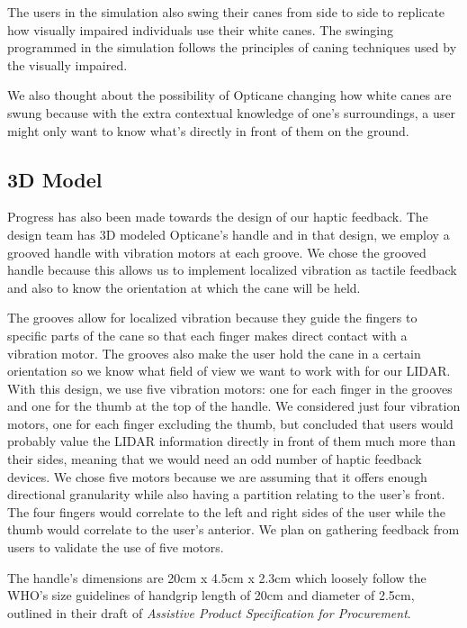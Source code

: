 \documentclass{article}
\begin{document}
The users in the simulation also swing their canes from side to side to replicate how visually impaired individuals use their white canes. The swinging programmed in the simulation follows the principles of caning techniques used by the visually impaired. \cite{rosen2014}

We also thought about the possibility of Opticane changing how white canes are swung because with the extra contextual knowledge of one's surroundings, a user might only want to know what's directly in front of them on the ground.

\subsection{3D Model}

Progress has also been made towards the design of our haptic feedback. The design team has 3D modeled Opticane's handle and in that design, we employ a grooved handle with vibration motors at each groove. We chose the grooved handle because this allows us to implement localized vibration as tactile feedback and also to know the orientation at which the cane will be held.

The grooves allow for localized vibration because they guide the fingers to specific parts of the cane so that each finger makes direct contact with a vibration motor. The grooves also make the user hold the cane in a certain orientation so we know what field of view we want to work with for our LIDAR. With this design, we use five vibration motors: one for each finger in the grooves and one for the thumb at the top of the handle. We considered just four vibration motors, one for each finger excluding the thumb, but concluded that users would probably value the LIDAR information directly in front of them much more than their sides, meaning that we would need an odd number of haptic feedback devices. We chose five motors because we are assuming that it offers enough directional granularity while also having a partition relating to the user's front. The four fingers would correlate to the left and right sides of the user while the thumb would correlate to the user's anterior. We plan on gathering feedback from users to validate the use of five motors.

The handle's dimensions are 20cm x 4.5cm x 2.3cm which loosely follow the WHO's size guidelines of handgrip length of 20cm and diameter of 2.5cm, outlined in their draft of \textit{Assistive Product Specification for Procurement}. \cite{who2020}
\end{document}
